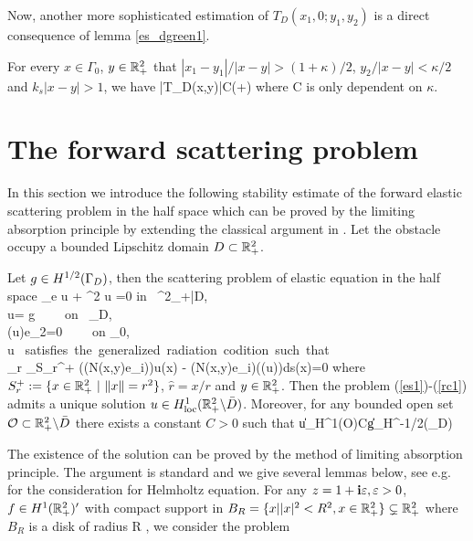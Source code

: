 \documentclass[12pt]{iopart}
\begin{document}
\finproof
Now, another more sophisticated estimation of $T_D(x_1,0;y_1,y_2)$ is a direct consequence of lemma \ref{es_dgreen1}.
\begin{lem}\label{es_dgreen2}
	For every $x\in\Gamma_0$, $y\in{\mathbb{R}}_+^2$ that $|x_1-y_1|/|x-y|>(1+\kappa)/2$, $y_2/|x-y|<\kappa/2$ and $k_s |x-y|>1$, we have
	\be
	|T_D(x,y)|\leq C(+)
	\ee
	where C is only dependent on $\kappa$.
\end{lem}


\section{The forward scattering problem}

In this section we introduce the following stability estimate of the forward elastic scattering problem in the half space which can be proved by the limiting absorption principle by extending the classical argument in \cite{leis,wilcox1975,Yves1988}. Let the obstacle occupy a bounded Lipschitz domain $D\subset {\mathbb{R}}^2_+$.
\begin{thm} \label{eu1}
	Let $g \in H^{1/2}(\Gamma_D)$, then the scattering problem of elastic equation in the half space
	\be
	\Delta_e u + \omega^2 u =0 \qquad\mbox{\rm in } \R^2_+\bks \bar{D}, \label{es1}\ \ \
	\\ u= g \ \ \ \ \mbox{\rm on } \Ga_D, \label{es2} \\
	\sigma(u)e_2=0 \ \ \ \ \mbox{\rm on} \Ga_0, \label{es3} \\
	u \ \mbox{satisfies the generalized radiation codition\cite{Guzina2006} such that} \nn \\\label{rc1}
	\lim_{r\to\infty}  \int_{S_r^+} (\sigma(N(x,y)e_i))\cdot u(x) - (N(x,y)e_i)\cdot (\sigma(u)\hat{r})ds(x)=0
	\ee
	where $S_r^+:=\{x\in {\mathbb{R}}^2_+ \ | \ \|x\|=r^2\}$, $\hat{r}=x/r$ and $y\in {\mathbb{R}}_+^2$. Then the problem (\ref{es1})-(\ref{rc1})
	admits a unique solution $u \in H^{1}_{\rm loc}({\mathbb{R}}^2_+ \backslash \bar D)$. Moreover, for any bounded open set $\mathcal O\subset {\mathbb{R}}^2_+\backslash\bar D$ there exists a constant $C>0$ such that
	\be \label{es4}
	\|u\|_{H^{1}(\mathcal O)}\le C\|g\|_{H^{-1/2}(\Ga_D)}
	\ee
\end{thm}
The existence of the solution can be proved by the method of limiting absorption principle. The argument is standard and we give several lemmas below, see e.g. \cite{leis} for the consideration for Helmholtz equation. For any $z=1+\mathbf{i}\varepsilon,\varepsilon>0$, $f\in H^{1}({\mathbb{R}}^2_+)'$ with compact support in $B_R=\{x||x|^2<R^2,x\in{\mathbb{R}}^2_+\}\subsetneq{\mathbb{R}}_+^2$ where $B_R$ is a disk of radius R , we consider the problem
\end{document}
